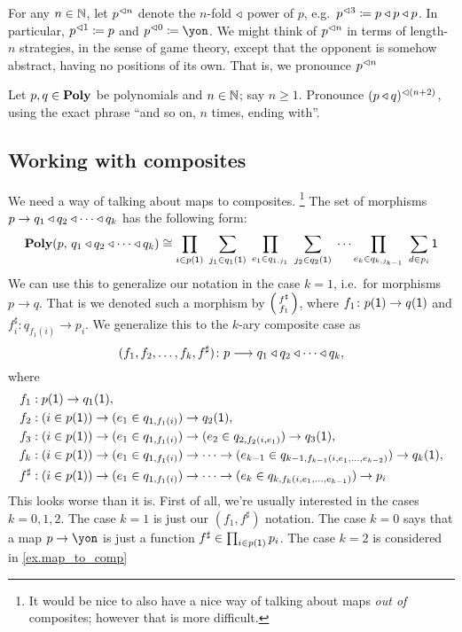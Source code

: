 \documentclass[DynamicalBook]{subfiles}
\begin{document}
For any $n\in\mathbb{N}$, let $p^{\lhd n}$ denote the $n$-fold $\mathbin{\triangleleft}$ power of $p$, e.g.\ $p^{\lhd 3}\coloneqq p\mathbin{\triangleleft} p\mathbin{\triangleleft} p$. In particular, $p^{\lhd 1}\coloneqq p$ and $p\tripow{0}\coloneqq\yon$. We might think of $p^{\lhd n}$ in terms of length-$n$ strategies, in the sense of game theory, except that the opponent is somehow abstract, having no positions of its own. That is, we pronounce $p^{\lhd n}$

\begin{exercise}
Let $p,q\in\textbf{Poly}$ be polynomials and $n\in\mathbb{N}$; say $n\geq 1$. Pronounce $(p\mathbin{\triangleleft} q)^{\lhd (n+2)}$, using the exact phrase ``and so on, $n$ times, ending with''.
\end{exercise}


\subsection{Working with composites}\label{subsec.working_with_composites}

We need a way of talking about maps to composites.%
\footnote{It would be nice to also have a nice way of talking about maps \emph{out of} composites; however that is more difficult.} 
The set of morphisms $p\to q_1\mathbin{\triangleleft} q_2\mathbin{\triangleleft}\cdots\mathbin{\triangleleft} q_k$ has the following form:
\[
  \textbf{Poly}(p,\, q_1\mathbin{\triangleleft} q_2\mathbin{\triangleleft}\cdots\mathbin{\triangleleft} q_k)
  \cong
  \prod_{i\in p(\textsf{1})}\;
  	\sum_{j_1\in q_1(\textsf{1})}\;
  \prod_{e_1\in q_{1,j_1}}\;
  	\sum_{j_2\in q_2(\textsf{1})}\;\cdots
  \prod_{e_k\in q_{k,j_{k-1}}}\;
  	\sum_{d\in p_i}
	\textsf{1}
\]
We can use this to generalize our notation in the case $k=1$, i.e.\ for morphisms $p\to q$. That is we denoted such a morphism by $\lens{f^\sharp}{f_1}$, where $f_1\colon p(\textsf{1})\to q(\textsf{1})$ and $f^\sharp_i\colon q_{f_1(i)}\to p_i$. We generalize this to the $k$-ary composite case as
\begin{equation}\label{eqn.notation_f1f2fk}
(f_1,f_2,\ldots,f_k,f^\sharp)\colon p\longrightarrow q_1\mathbin{\triangleleft} q_2\mathbin{\triangleleft}\cdots\mathbin{\triangleleft} q_k,
\end{equation}
where
\begin{equation}\label{eqn.maps_to_comp}
\begin{aligned}
f_1&:p(\textsf{1})\to q_1(\textsf{1}),\\
f_2&:(i\in p(\textsf{1}))\to (e_1\in q_{1,f_1(i)})\to q_2(\textsf{1}),\\
f_3&:(i\in p(\textsf{1}))\to (e_1\in q_{1,f_1(i)})\to (e_2\in q_{2,f_2(i,e_1)})\to q_3(\textsf{1}),\\
f_k&:(i\in p(\textsf{1}))\to (e_1\in q_{1,f_1(i)})\to  \cdots\to(e_{k-1}\in q_{k-1,f_{k-1}(i,e_1,\ldots,e_{k-2})})\to q_k(\textsf{1}),\\
f^\sharp&:(i\in p(\textsf{1}))\to (e_1\in q_{1,f_1(i)})\to \cdots\to(e_{k}\in q_{k,f_{k}(i,e_1,\ldots,e_{k-1})})\to p_i
\end{aligned}
\end{equation}
This looks worse than it is. First of all, we're usually interested in the cases $k=0,1,2$. The case $k=1$ is just our $(f_1,f^\sharp)$ notation. The case $k=0$ says that a map $p\to\yon$ is just a function $f^\sharp\in\prod_{i\in p(\textsf{1})}p_i$. The case $k=2$ is considered in \cref{ex.map_to_comp}
\end{document}
